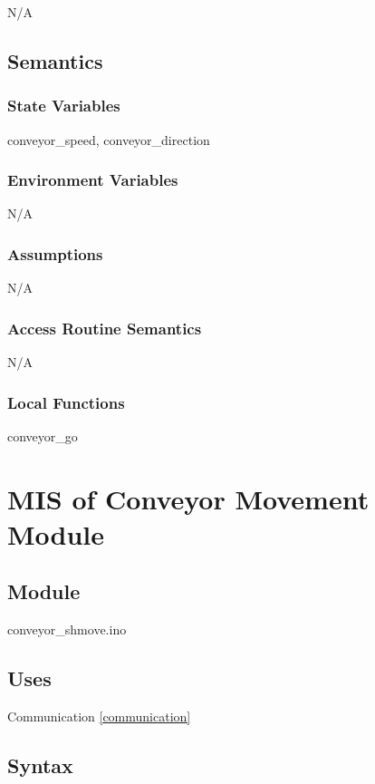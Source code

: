 \documentclass[12pt, titlepage]{article}
\begin{document}
N/A

\subsection{Semantics}

\subsubsection{State Variables}

conveyor\_speed, conveyor\_direction

\subsubsection{Environment Variables}

N/A

\subsubsection{Assumptions}

N/A
\subsubsection{Access Routine Semantics}

N/A
\subsubsection{Local Functions}

conveyor\_go

  \section{MIS of Conveyor Movement Module} \label{conveyorMovement}


\subsection{Module}

conveyor\_shmove.ino

\subsection{Uses}
Communication \ref{communication}

\subsection{Syntax}
\end{document}
